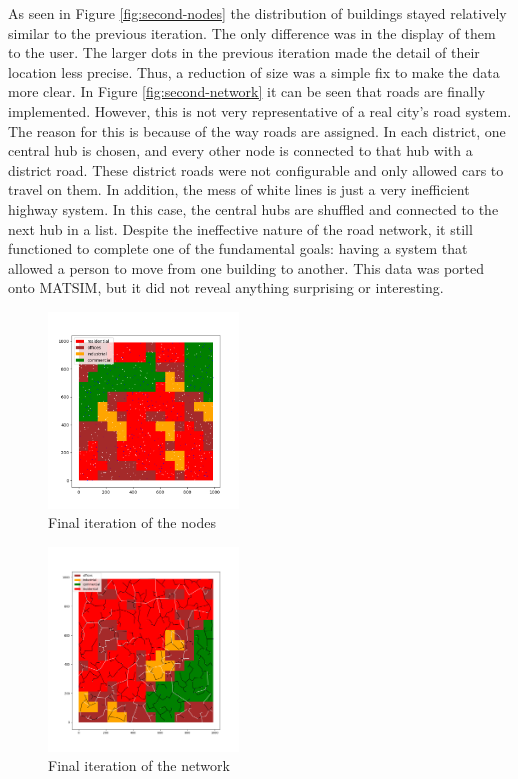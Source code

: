 \documentclass[11pt]{article}
\begin{document}
\begin{multicols}{2}
    \quad As seen in Figure \ref{fig:second-nodes} the distribution of buildings stayed relatively similar to the previous iteration. The only difference was in the display of them to the user. The larger dots in the previous iteration made the detail of their location less precise. Thus, a reduction of size was a simple fix to make the data more clear. In Figure \ref{fig:second-network} it can be seen that roads are finally implemented. However, this is not very representative of a real city's road system. The reason for this is because of the way roads are assigned. In each district, one central hub is chosen, and every other node is connected to that hub with a district road. These district roads were not configurable and only allowed cars to travel on them. In addition, the mess of white lines is just a very inefficient highway system. In this case, the central hubs are shuffled and connected to the next hub in a list. Despite the ineffective nature of the road network, it still functioned to complete one of the fundamental goals: having a system that allowed a person to move from one building to another. This data was ported onto MATSIM\cite{matsim}, but it did not reveal anything surprising or interesting. \\

    \begin{figure}[H]
        \centering
        \includegraphics[width=0.45\textwidth]{images/finalzoningwnodes.png}
        \caption{Final iteration of the nodes}
        \label{fig:first-zoning}
    \end{figure}

    \begin{figure}[H]
        \centering
        \includegraphics[width=0.45\textwidth]{images/finalnetwork.png}
        \caption{Final iteration of the network}
        \label{fig:first-zoning}
    \end{figure}


\end{multicols}
\end{document}
